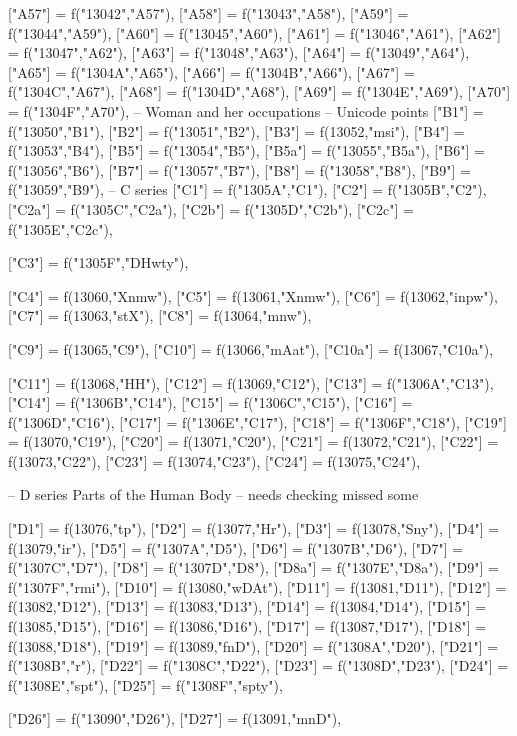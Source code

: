 \documentclass{article}
\begin{document}
\begin{luacode*}
{	["A57"] = f("13042","A57"),
	["A58"] = f("13043","A58"),
	["A59"] = f("13044","A59"),
	["A60"] = f("13045","A60"),
	["A61"] = f("13046","A61"),
	["A62"] = f("13047","A62"),
	["A63"] = f("13048","A63"),
	["A64"] = f("13049","A64"),
	["A65"] = f("1304A","A65"),
	["A66"] = f("1304B","A66"),
	["A67"] = f("1304C","A67"),
	["A68"] = f("1304D","A68"),
	["A69"] = f("1304E","A69"),
	["A70"] = f("1304F","A70"),
-- Woman and her occupations
-- Unicode points 
	["B1"] = f("13050","B1"),
	["B2"] = f("13051","B2"),
	["B3"] = f(13052,"msi"),
	["B4"] = f("13053","B4"),
	["B5"] = f("13054","B5"),
	["B5a"] = f("13055","B5a"),
	["B6"] = f("13056","B6"),
	["B7"] = f("13057","B7"),
	["B8"] = f("13058","B8"),
	["B9"] = f("13059","B9"),
-- C series
	["C1"] = f("1305A","C1"),
	["C2"] = f("1305B","C2"),
	["C2a"] = f("1305C","C2a"),
	["C2b"] = f("1305D","C2b"),
	["C2c"] = f("1305E","C2c"),

	["C3"] = f("1305F","DHwty"),

	["C4"] = f(13060,"Xnmw"),
	["C5"] = f(13061,"Xnmw"),
	["C6"] = f(13062,"inpw"),
	["C7"] = f(13063,"stX"),
	["C8"] = f(13064,"mnw"),

   ["C9"]  = f(13065,"C9"),  
	["C10"] = f(13066,"mAat"),
	["C10a"] = f(13067,"C10a"),

	["C11"] = f(13068,"HH"),
	["C12"] = f(13069,"C12"),
	["C13"] = f("1306A","C13"),
	["C14"] = f("1306B","C14"),
	["C15"] = f("1306C","C15"),
	["C16"] = f("1306D","C16"),
	["C17"] = f("1306E","C17"),
	["C18"] = f("1306F","C18"),
	["C19"] = f(13070,"C19"),
	["C20"] = f(13071,"C20"),
	["C21"] = f(13072,"C21"),
	["C22"] = f(13073,"C22"),
	["C23"] = f(13074,"C23"),
	["C24"] = f(13075,"C24"),

-- D series Parts of the Human Body
-- needs checking missed some

	["D1"] = f(13076,"tp"),
	["D2"] = f(13077,"Hr"),
	["D3"] = f(13078,"Sny"),
	["D4"] = f(13079,"ir"),
	["D5"] = f("1307A","D5"),
	["D6"] = f("1307B","D6"),
	["D7"] = f("1307C","D7"),
	["D8"] = f("1307D","D8"),
	["D8a"] = f("1307E","D8a"),
	["D9"] = f("1307F","rmi"),
	["D10"] = f(13080,"wDAt"),
	["D11"] = f(13081,"D11"),
	["D12"] = f(13082,"D12"),
	["D13"] = f(13083,"D13"),
	["D14"] = f(13084,"D14"),
	["D15"] = f(13085,"D15"),
	["D16"] = f(13086,"D16"),
	["D17"] = f(13087,"D17"),
	["D18"] = f(13088,"D18"),
	["D19"] = f(13089,"fnD"),
	["D20"] = f("1308A","D20"),
	["D21"] = f("1308B","r"),
	["D22"] = f("1308C","D22"),
	["D23"] = f("1308D","D23"),
	["D24"] = f("1308E","spt"),
	["D25"] = f("1308F","spty"),

	["D26"] = f("13090","D26"),
	["D27"] = f(13091,"mnD"),

}
\end{luacode*}
\end{document}
